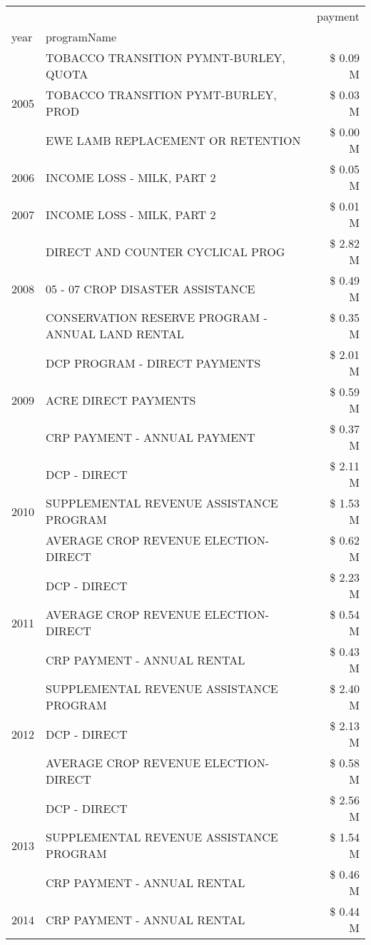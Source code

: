 \begin{tabular}{llr}
\toprule
 &  & payment \\
year & programName &  \\
\midrule
\multirow[t]{3}{*}{2005} & TOBACCO TRANSITION PYMNT-BURLEY, QUOTA & \$ 0.09 M \\
 & TOBACCO TRANSITION PYMT-BURLEY, PROD & \$ 0.03 M \\
 & EWE LAMB REPLACEMENT OR RETENTION & \$ 0.00 M \\
\cline{1-3}
2006 & INCOME LOSS - MILK, PART 2 & \$ 0.05 M \\
\cline{1-3}
2007 & INCOME LOSS - MILK, PART 2 & \$ 0.01 M \\
\cline{1-3}
\multirow[t]{3}{*}{2008} & DIRECT AND COUNTER CYCLICAL PROG & \$ 2.82 M \\
 & 05 - 07 CROP DISASTER ASSISTANCE & \$ 0.49 M \\
 & CONSERVATION RESERVE PROGRAM - ANNUAL LAND RENTAL & \$ 0.35 M \\
\cline{1-3}
\multirow[t]{3}{*}{2009} & DCP PROGRAM - DIRECT PAYMENTS & \$ 2.01 M \\
 & ACRE DIRECT PAYMENTS & \$ 0.59 M \\
 & CRP PAYMENT - ANNUAL PAYMENT & \$ 0.37 M \\
\cline{1-3}
\multirow[t]{3}{*}{2010} & DCP - DIRECT & \$ 2.11 M \\
 & SUPPLEMENTAL REVENUE ASSISTANCE PROGRAM & \$ 1.53 M \\
 & AVERAGE CROP REVENUE ELECTION-DIRECT & \$ 0.62 M \\
\cline{1-3}
\multirow[t]{3}{*}{2011} & DCP - DIRECT & \$ 2.23 M \\
 & AVERAGE CROP REVENUE ELECTION-DIRECT & \$ 0.54 M \\
 & CRP PAYMENT - ANNUAL RENTAL & \$ 0.43 M \\
\cline{1-3}
\multirow[t]{3}{*}{2012} & SUPPLEMENTAL REVENUE ASSISTANCE PROGRAM & \$ 2.40 M \\
 & DCP - DIRECT & \$ 2.13 M \\
 & AVERAGE CROP REVENUE ELECTION-DIRECT & \$ 0.58 M \\
\cline{1-3}
\multirow[t]{3}{*}{2013} & DCP - DIRECT & \$ 2.56 M \\
 & SUPPLEMENTAL REVENUE ASSISTANCE PROGRAM & \$ 1.54 M \\
 & CRP PAYMENT - ANNUAL RENTAL & \$ 0.46 M \\
\cline{1-3}
\multirow[t]{3}{*}{2014} & CRP PAYMENT - ANNUAL RENTAL & \$ 0.44 M \\

\end{tabular}
